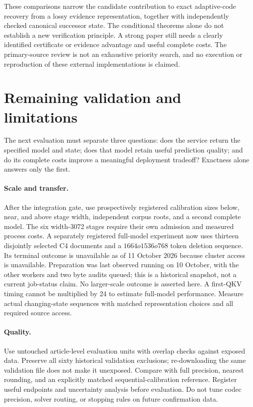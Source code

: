 \documentclass[10pt,twocolumn,letterpaper]{article}
\begin{document}
These comparisons narrow the candidate contribution to exact adaptive-code
recovery from a lossy evidence representation, together with independently
checked canonical successor state. The conditional theorems alone do not
establish a new verification principle. A strong paper still needs a clearly
identified certificate or evidence advantage and useful complete costs. The
primary-source review is not an exhaustive priority search, and no execution or
reproduction of these external implementations is claimed.

\section{Remaining validation and limitations}
The next evaluation must separate three questions: does the service return the
specified model and state; does that model retain useful prediction quality; and
do its complete costs improve a meaningful deployment tradeoff? Exactness alone
answers only the first.

\paragraph{Scale and transfer.}
After the integration gate, use prospectively registered calibration sizes below,
near, and above stage width, independent corpus roots, and a second complete model.
The six width-3072 stages require their own admission and measured process costs.
A separately registered full-model experiment now uses thirteen disjointly
selected C4 documents and a $1664	o1536	o768$ token deletion sequence. Its
terminal outcome is unavailable as of 11 October 2026 because cluster access
is unavailable. Preparation was last observed running on 10 October, with
the other workers and two byte audits queued; this is a historical snapshot,
not a current job-status claim. No larger-scale outcome is asserted here.
A first-QKV timing cannot be multiplied by 24 to estimate full-model performance.
Measure actual changing-state sequences with matched representation choices and
all required source access.

\paragraph{Quality.}
Use untouched article-level evaluation units with overlap checks against exposed
data. Preserve all sixty historical validation exclusions; re-downloading the
same validation file does not make it unexposed. Compare with full precision,
nearest rounding, and an explicitly matched sequential-calibration reference.
Register useful endpoints and uncertainty analysis before evaluation. Do not tune
codec precision, solver routing, or stopping rules on future confirmation data.
\end{document}

